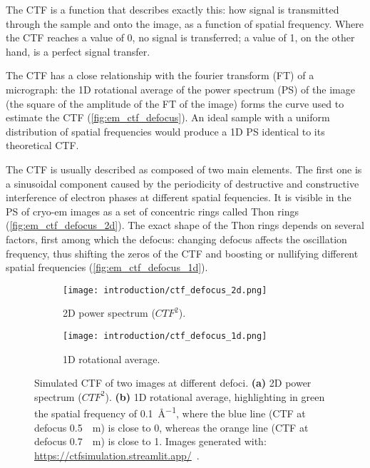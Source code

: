 The CTF is a function that describes exactly this: how signal is transmitted through the sample and onto the image, as a function of spatial frequency.
Where the CTF reaches a value of \num{0}, no signal is transferred; a value of \num{1}, on the other hand, is a perfect signal transfer.

The CTF has a close relationship with the fourier transform (FT) of a micrograph: the 1D rotational average of the power spectrum (PS) of the image (the square of the amplitude of the FT of the image) forms the curve used to estimate the CTF (\autoref{fig:em_ctf_defocus}).
An ideal sample with a uniform distribution of spatial frequencies would produce a 1D PS identical to its theoretical CTF.

The CTF is usually described as composed of two main elements.
The first one is a sinusoidal component caused by the periodicity of destructive and constructive interference of electron phases at different spatial fequencies.
It is visible in the PS of cryo-em images as a set of concentric rings called Thon rings (\autoref{fig:em_ctf_defocus_2d}).
The exact shape of the Thon rings depends on several factors, first among which the defocus: changing defocus affects the oscillation frequency, thus shifting the zeros of the CTF and boosting or nullifying different spatial frequencies (\autoref{fig:em_ctf_defocus_1d}).

\begin{figure}[ht]
    \centering
    \begin{subfigure}{\textwidth}
        \centering
        \texttt{[image: introduction/ctf\_defocus\_2d.png]}
        \caption{2D power spectrum ($CTF^2$).}
        \label{fig:em_ctf_defocus_2d}
    \end{subfigure}%

    \begin{subfigure}{\textwidth}
        \centering
        \texttt{[image: introduction/ctf\_defocus\_1d.png]}
        \caption{1D rotational average.}
        \label{fig:em_ctf_defocus_1d}
    \end{subfigure}%

    \caption[CTF: effect of defocus]{Simulated CTF of two images at different defoci. \textbf{(a)} 2D power spectrum ($CTF^2$). \textbf{(b)} 1D rotational average, highlighting in green the spatial frequency of \qty{0.1}{\angstrom^{-1}}, where the blue line (CTF at defocus \qty{0.5}{{\mu}m}) is close to \num{0}, whereas the orange line (CTF at defocus \qty{0.7}{{\mu}m}) is close to \num{1}. Images generated with: \url{https://ctfsimulation.streamlit.app/}~\cite{jiangWebbasedSimulationContrast2001}.}
    \label{fig:em_ctf_defocus}
\end{figure}

